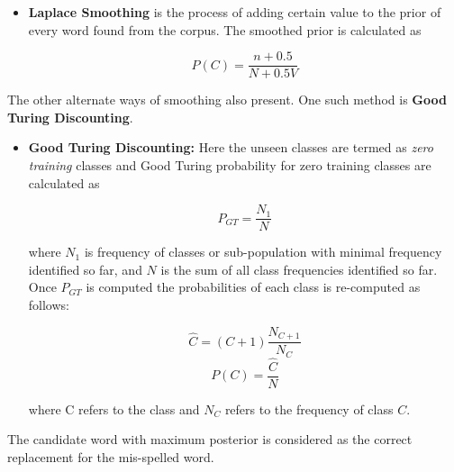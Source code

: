 \documentclass{bmcart}
\begin{document}
	\begin{itemize}
	\item {\bf Laplace Smoothing} is the process of adding certain value to the prior of every word found from the corpus. The smoothed prior is calculated as 
	\begin{center}
	\begin{equation*}
	P(C) = \frac{n+0.5}{N+0.5V}
	\end{equation*}
	\label{eqn:laplaceSmoothing}
	\end{center}
	\end{itemize}

	The other alternate ways of smoothing also present. One such method is {\bf Good Turing Discounting}. 
	\begin{itemize}
	\item {\bf Good Turing Discounting:} Here the unseen classes are termed as {\it zero training } classes and Good Turing probability for zero training classes are calculated as
	\begin{center}
	\begin{equation}
	P_{GT} = \frac{N_1}{N}
	\end{equation}
	\label{eqn:pgt_unseen}
	\end{center}
	where $N_1$ is frequency of classes or sub-population with minimal frequency identified so far, and $N$ is the sum of all class frequencies identified so far.
	Once $P_{GT}$ is computed the probabilities of each class is re-computed as follows:
	\begin{center}
	\begin{equation}
	\hat{C} = (C+1) \frac{N_{C+1}}{N_C}
	\end{equation}
	\label{eqn:pgt-re-est}
	\vspace{-1cm}
	\begin{equation}
	P(C)=\frac{\hat{C}}{N}
	\end{equation}
	\label{eqn:pgt-new-prob}
	\end{center}
	where C refers to the class and $N_C$ refers to the frequency of class $C$.
\end{itemize}	 

The candidate word with maximum posterior is considered as the correct replacement for the mis-spelled word.
\end{document}
